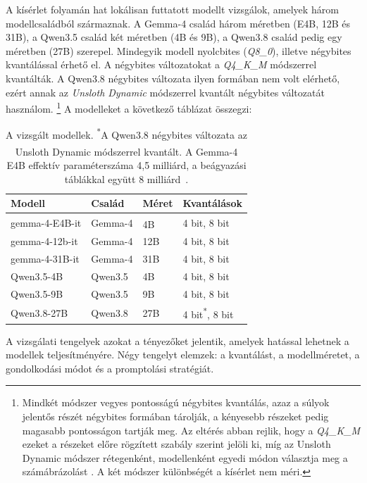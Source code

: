 \documentclass[
]{elteikthesis}[2024/04/26]
\begin{document}
A kísérlet folyamán hat lokálisan futtatott modellt vizsgálok, amelyek három
modellcsaládból származnak. A Gemma-4 család három méretben (E4B, 12B és 31B), a
Qwen3.5 család két méretben (4B és 9B), a Qwen3.8 család pedig egy méretben
(27B) szerepel. Mindegyik modell nyolcbites (\textit{Q8\_0}), illetve négybites
kvantálással érhető el. A négybites változatokat a \textit{Q4\_K\_M} módszerrel
kvantálták. A Qwen3.8 négybites változata ilyen formában nem volt elérhető,
ezért annak az \textit{Unsloth Dynamic} módszerrel kvantált négybites változatát
használom.%
\footnote{Mindkét módszer vegyes pontosságú négybites kvantálás, azaz a súlyok
jelentős részét négybites formában tárolják, a kényesebb részeket pedig magasabb
pontosságon tartják meg. Az eltérés abban rejlik, hogy a \textit{Q4\_K\_M}
ezeket a részeket előre rögzített szabály szerint jelöli ki, míg az Unsloth
Dynamic módszer rétegenként, modellenként egyedi módon választja meg a
számábrázolást \cite{unsloth2026dynamic}. A két módszer különbségét a kísérlet
nem méri.} A modelleket a következő táblázat összegzi:

\begin{table}[htb]
	\centering
	\small
	\begin{tabular}{ | l | l | l | l | }
		\hline
		\textbf{Modell} & \textbf{Család} & \textbf{Méret} & \textbf{Kvantálások} \\
		\hline \hline
		gemma-4-E4B-it & Gemma-4 & 4B\textsuperscript{\dag} & 4 bit, 8 bit \\
		\hline
		gemma-4-12b-it & Gemma-4 & 12B & 4 bit, 8 bit \\
		\hline
		gemma-4-31B-it & Gemma-4 & 31B & 4 bit, 8 bit \\
		\hline
		Qwen3.5-4B & Qwen3.5 & 4B & 4 bit, 8 bit \\
		\hline
		Qwen3.5-9B & Qwen3.5 & 9B & 4 bit, 8 bit \\
		\hline
		Qwen3.8-27B & Qwen3.8 & 27B & 4 bit\textsuperscript{*}, 8 bit \\
		\hline
	\end{tabular}
	\caption[A vizsgált modellek]{A vizsgált modellek. \textsuperscript{*}A Qwen3.8
	négybites változata az Unsloth Dynamic módszerrel kvantált. \textsuperscript{\dag}A Gemma-4 E4B effektív
	paraméterszáma 4,5 milliárd, a beágyazási táblákkal együtt 8 milliárd~\cite{google2026gemma4}.}
	\label{tab:method:models}
\end{table}

A vizsgálati tengelyek azokat a tényezőket jelentik, amelyek hatással lehetnek a
modellek teljesítményére. Négy tengelyt elemzek: a kvantálást, a modellméretet, 
a gondolkodási módot és a promptolási stratégiát. %
\end{document}
